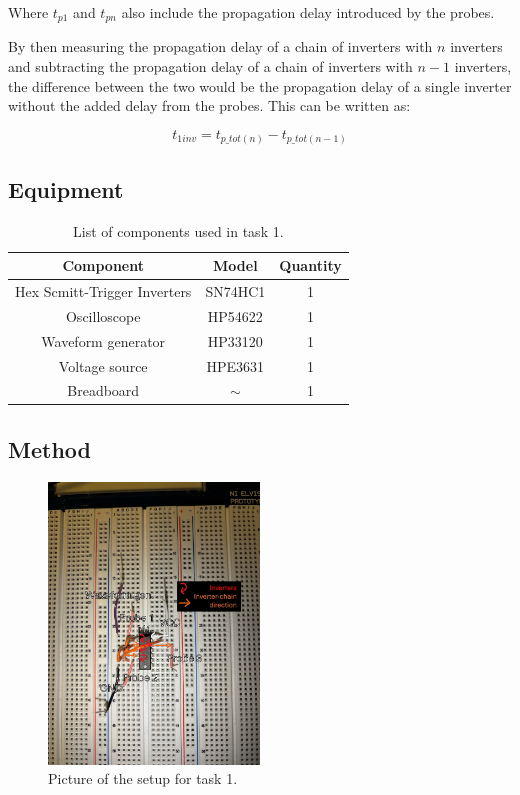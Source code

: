 \documentclass[onecolumn]{article}
\begin{document}
Where $t_{p1}$ and $t_{pn}$ also include the propagation delay introduced by the probes.

By then measuring the propagation delay of a chain of inverters with $n$ inverters and subtracting the propagation delay of a chain of inverters with $n-1$ inverters, the difference between the two would be the propagation delay of a single inverter without the added delay from the probes. This can be written as:

\begin{equation}
    t_{1inv} = t_{p\_tot(n)} - t_{p\_tot(n-1)} \label{eq:1inv}
\end{equation}

\subsection{Equipment}
\begin{table}[h!]
    \centering
    \begin{tabular}{|c|c|c|}
        \hline
        \textbf{Component} & \textbf{Model} & \textbf{Quantity} \\
        \hline
        Hex Scmitt-Trigger Inverters & SN74HC1 & 1 \\
        Oscilloscope & HP54622 & 1 \\
        Waveform generator  & HP33120 & 1\\
        Voltage source & HPE3631 & 1 \\
        Breadboard & $\sim$ & 1 \\
        \hline
    \end{tabular}
    \caption{List of components used in task 1.}
    \label{tab:bom}
\end{table}

\clearpage

\subsection{Method}

\begin{figure}[h!]
    \centering
    \includegraphics[width=0.5\textwidth]{Circuit_draw.jpg}
    \caption{Picture of the setup for task 1.}  
    \label{fig:circuit}
\end{figure}
\end{document}

